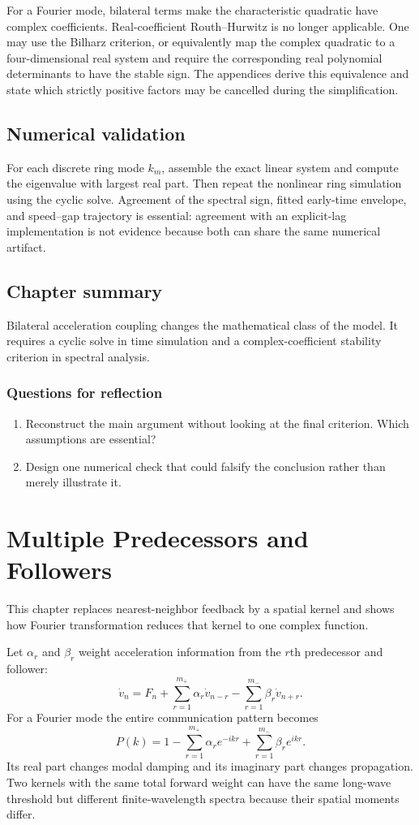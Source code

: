 \documentclass[11pt,a4paper,openany]{book}
\numberwithin{equation}{chapter}
\numberwithin{figure}{chapter}
\numberwithin{table}{chapter}
\newcommand{\chapterguide}[1]{\begin{tcolorbox}[keybox,title=Chapter guide]#1\end{tcolorbox}}
\newcommand{\chapterend}[1]{\section*{Chapter summary}\addcontentsline{toc}{section}{Chapter summary}\begin{tcolorbox}[resultbox]#1\end{tcolorbox}\subsection*{Questions for reflection}\begin{enumerate}[leftmargin=1.7em]\item Reconstruct the main argument without looking at the final criterion. Which assumptions are essential?\item Design one numerical check that could falsify the conclusion rather than merely illustrate it.\end{enumerate}\clearpage}
\begin{document}
For a Fourier mode, bilateral terms make the characteristic quadratic have complex coefficients. Real-coefficient Routh--Hurwitz is no longer applicable. One may use the Bilharz criterion, or equivalently map the complex quadratic to a four-dimensional real system and require the corresponding real polynomial determinants to have the stable sign. The appendices derive this equivalence and state which strictly positive factors may be cancelled during the simplification.

\section{Numerical validation}
For each discrete ring mode $k_m$, assemble the exact linear system and compute the eigenvalue with largest real part. Then repeat the nonlinear ring simulation using the cyclic solve. Agreement of the spectral sign, fitted early-time envelope, and speed--gap trajectory is essential: agreement with an explicit-lag implementation is not evidence because both can share the same numerical artifact.

\chapterend{Bilateral acceleration coupling changes the mathematical class of the model. It requires a cyclic solve in time simulation and a complex-coefficient stability criterion in spectral analysis.}

\chapter{Multiple Predecessors and Followers}
\chapterguide{This chapter replaces nearest-neighbor feedback by a spatial kernel and shows how Fourier transformation reduces that kernel to one complex function.}

Let $\alpha_r$ and $\beta_r$ weight acceleration information from the $r$th predecessor and follower:
\begin{equation}
\dot v_n=F_n+\sum_{r=1}^{m_+}\alpha_r\dot v_{n-r}-\sum_{r=1}^{m_-}\beta_r\dot v_{n+r}.
\end{equation}
For a Fourier mode the entire communication pattern becomes
\begin{equation}
P(k)=1-\sum_{r=1}^{m_+}\alpha_re^{-ikr}+\sum_{r=1}^{m_-}\beta_re^{ikr}.
\end{equation}
Its real part changes modal damping and its imaginary part changes propagation. Two kernels with the same total forward weight can have the same long-wave threshold but different finite-wavelength spectra because their spatial moments differ.
\end{document}
